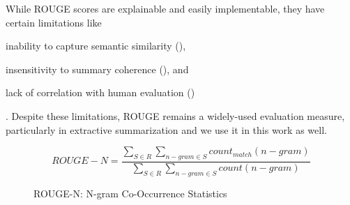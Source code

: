 While ROUGE scores are explainable and easily implementable, they have certain limitations like
\begin{enumerate*}
    \item inability to capture semantic similarity (\cite{akter-etal-2022-revisiting}),
    \item insensitivity to summary coherence (\cite{christensen-etal-2013-towards}), and
    \item lack of correlation with human evaluation (\cite{liu2010exploring})
\end{enumerate*}.
Despite these limitations, ROUGE remains a widely-used evaluation measure, particularly in extractive summarization and we use it in this work as well.



\begin{figure}[h]
    \centering
    \begin{equation}
        ROUGE-N = \frac{\sum_{S \in R} \sum_{n-gram \in S} count_{match}(n-gram)}{\sum_{S \in R} \sum_{n-gram \in S} count(n-gram)}\label{eq:equation}
    \end{equation}
    \caption{ROUGE-N: N-gram Co-Occurrence Statistics}
    \label{fig:rouge_formula}
\end{figure}